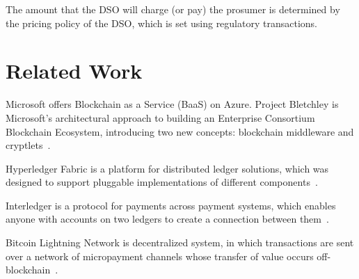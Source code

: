 \documentclass[sigconf]{acmart}
\begin{document}
The amount that the DSO will charge (or pay) the prosumer is determined by the pricing policy of the DSO, which is set using regulatory transactions.


\section{Related Work}

Microsoft offers Blockchain as a Service (BaaS) on Azure.
Project Bletchley is Microsoft's architectural approach to building an Enterprise Consortium Blockchain Ecosystem, introducing two new concepts: blockchain middleware and cryptlets~\cite{gray2016introducing}.

Hyperledger Fabric is a platform for distributed ledger solutions, which was designed to support pluggable implementations of different components~\cite{hyperledger2017fabric}.

Interledger is a protocol for payments across payment systems, which enables anyone with accounts on two ledgers to create
a connection between them~\cite{thomas_protocol}.

Bitcoin Lightning Network is decentralized system, in which transactions are sent over a network of micropayment channels whose transfer of value occurs off-blockchain~\cite{poon2016bitcoin}.




\end{document}
